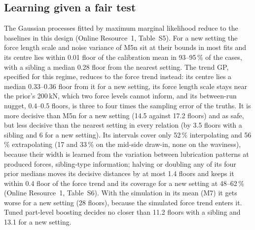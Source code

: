 \documentclass[pdflatex,sn-basic,lineno]{sn-jnl}
\newcommand{\ORt}[1]{Online Resource~1, Table~S#1}
\begin{document}
\subsection{Learning given a fair test}\label{sec:res-ml}

The Gaussian processes fitted by maximum marginal likelihood reduce to the baselines in this design (\ORt{5}). For a new setting the force length scale and noise variance of M5n sit at their bounds in most fits and its centre lies within 0.01 floor of the calibration mean in 93--95\,\% of the cases, with a sibling a median 0.28 floor from the nearest setting. The trend GP, specified for this regime, reduces to the force trend instead: its centre lies a median 0.33--0.36 floor from it for a new setting, its force length scale stays near the prior's 200\,kN, which two force levels cannot inform, and its between-run nugget, 0.4--0.5 floors, is three to four times the sampling error of the truths. It is more decisive than M5n for a new setting (14.5 against 17.2 floors) and as safe, but less decisive than the nearest setting in every relation (by 3.5 floors with a sibling and 6 for a new setting). Its intervals cover only 52\,\% interpolating and 56\,\% extrapolating (17 and 33\,\% on the mid-side draw-in, none on the waviness), because their width is learned from the variation between lubrication patterns at produced forces, sibling-type information; halving or doubling any of its four prior medians moves its decisive distances by at most 1.4 floors and keeps it within 0.4 floor of the force trend and its coverage for a new setting at 48--62\,\% (\ORt{6}). With the simulation in its mean (M7) it gets worse for a new setting (28 floors), because the simulated force trend enters it. Tuned part-level boosting decides no closer than 11.2 floors with a sibling and 13.1 for a new setting.
\end{document}

